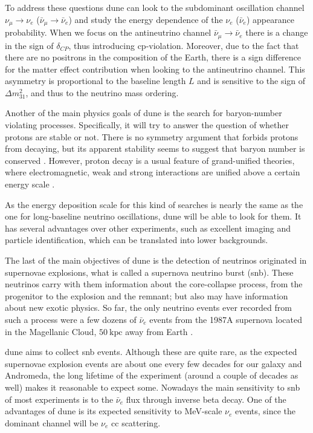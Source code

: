 To address these questions \gls{dune} can look to the subdominant oscillation channel $\nu_{\mu} \rightarrow \nu_{e}$ ($\bar{\nu}_{\mu} \rightarrow \bar{\nu}_{e}$) and study the energy dependence of the $\nu_{e}$ ($\bar{\nu}_{e}$) appearance probability. When we focus on the antineutrino channel $\bar{\nu}_{\mu} \rightarrow \bar{\nu}_{e}$ there is a change in the sign of $\delta_{CP}$, thus introducing \gls{cp}-violation. Moreover, due to the fact that there are no positrons in the composition of the Earth, there is a sign difference for the matter effect contribution when looking to the antineutrino channel. This asymmetry is proportional to the baseline length $L$ and is sensitive to the sign of $\Delta m^{2}_{31}$, and thus to the neutrino mass ordering.

Another of the main physics goals of \gls{dune} is the search for baryon-number violating processes. Specifically, it will try to answer the question of whether protons are stable or not. There is no symmetry argument that forbids protons from decaying, but its apparent stability seems to suggest that baryon number is conserved \cite{Super-Kamiokande2009}. However, proton decay is a usual feature of grand-unified theories, where electromagnetic, weak and strong interactions are unified above a certain energy scale \cite{Raby2006}.

As the energy deposition scale for this kind of searches is nearly the same as the one for long-baseline neutrino oscillations, \gls{dune} will be able to look for them. It has several advantages over other experiments, such as excellent imaging and particle identification, which can be translated into lower backgrounds.

The last of the main objectives of \gls{dune} is the detection of neutrinos originated in supernovae explosions, what is called a supernova neutrino burst (\gls{snb}). These neutrinos carry with them information about the core-collapse process, from the progenitor to the explosion and the remnant; but also may have information about new exotic physics. So far, the only neutrino events ever recorded from such a process were a few dozens of $\bar{\nu}_{e}$ events from the 1987A supernova located in the Magellanic Cloud, $50~\mathrm{kpc}$ away from Earth \cite{Kamiokande-II1987, Bionta1987}.

\gls{dune} aims to collect \gls{snb} events. Although these are quite rare, as the expected supernovae explosion events are about one every few decades for our galaxy and Andromeda, the long lifetime of the experiment (around a couple of decades as well) makes it reasonable to expect some. Nowadays the main sensitivity to \gls{snb} of most experiments is to the $\bar{\nu}_{e}$ flux through inverse beta decay. One of the advantages of \gls{dune} is its expected sensitivity to MeV-scale $\nu_{e}$ events, since the dominant channel will be $\nu_{e}$ \gls{cc} scattering.

